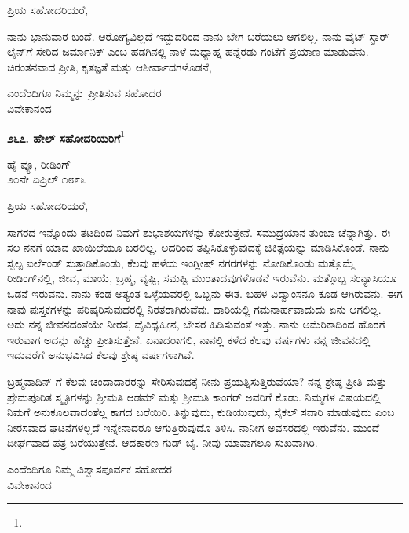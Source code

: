\noindent
ಪ್ರಿಯ ಸಹೋದರಿಯರೆ,

ನಾನು ಭಾನುವಾರ ಬಂದೆ. ಆರೋಗ್ಯವಿಲ್ಲದೆ ಇದ್ದುದರಿಂದ ನಾನು ಬೇಗ ಬರೆಯಲು ಆಗಲಿಲ್ಲ. ನಾನು ವೈಟ್‌ ಸ್ಟಾರ್‌ ಲೈನ್‌ಗೆ ಸೇರಿದ ಜರ್ಮಾನಿಕ್ ಎಂಬ ಹಡಗಿನಲ್ಲಿ ನಾಳೆ ಮಧ್ಯಾಹ್ನ ಹನ್ನೆರಡು ಗಂಟೆಗೆ ಪ್ರಯಾಣ ಮಾಡುವೆನು. ಚಿರಂತನವಾದ ಪ್ರೀತಿ, ಕೃತಜ್ಞತೆ ಮತ್ತು ಆಶೀರ್ವಾದಗಳೊಡನೆ,

\vspace{-0.5cm}

{\flushright
ಎಂದೆಂದಿಗೂ ನಿಮ್ಮನ್ನು ಪ್ರೀತಿಸುವ ಸಹೋದರ\\ವಿವೇಕಾನಂದ\par}


\begin{center}
\textbf{೨೬೭. ಹೇಲ್ ಸಹೋದರಿಯರಿಗೆ}\footnote{}
\end{center}

\vspace{-0.5cm}

\begin{flushright}
ಹೈ ವ್ಯೂ, ರೀಡಿಂಗ್\\೨೦ನೇ ಏಪ್ರಿಲ್ ೧೮೯೬
\end{flushright}

\vspace{-0.3cm}

\noindent
ಪ್ರಿಯ ಸಹೋದರಿಯರೆ,

ಸಾಗರದ ಇನ್ನೊಂದು ತಟದಿಂದ ನಿಮಗೆ ಶುಭಾಶಯಗಳನ್ನು ಕೋರುತ್ತೇನೆ. ಸಮುದ್ರಯಾನ ತುಂಬಾ ಚೆನ್ನಾಗಿತ್ತು. ಈ ಸಲ ನನಗೆ ಯಾವ ಖಾಯಿಲೆಯೂ ಬರಲಿಲ್ಲ. ಅದರಿಂದ ತಪ್ಪಿಸಿಕೊಳ್ಳುವುದಕ್ಕೆ ಚಿಕಿತ್ಸೆಯನ್ನು ಮಾಡಿಸಿಕೊಂಡೆ. ನಾನು ಸ್ವಲ್ಪ ಐರ್ಲೆಂಡ್ ಸುತ್ತಾಡಿಕೊಂಡು, ಕೆಲವು ಹಳೆಯ ಇಂಗ್ಲೀಷ್ ನಗರಗಳನ್ನು ನೋಡಿಕೊಂಡು ಮತ್ತೊಮ್ಮೆ ರೀಡಿಂಗ್‌ನಲ್ಲಿ, ಜೀವ, ಮಾಯೆ, ಬ್ರಹ್ಮ, ವ್ಯಷ್ಟಿ, ಸಮಷ್ಟಿ ಮುಂತಾದವುಗಳೊಡನೆ ಇರುವೆನು. ಮತ್ತೊಬ್ಬ ಸಂನ್ಯಾಸಿಯೂ ಒಡನೆ ಇರುವನು. ನಾನು ಕಂಡ ಅತ್ಯಂತ ಒಳ್ಳೆಯವರಲ್ಲಿ ಒಬ್ಬನು ಈತ. ಬಹಳ ವಿದ್ವಾಂಸನೂ ಕೂಡ ಆಗಿರುವನು. ಈಗ ನಾವು ಪುಸ್ತಕಗಳನ್ನು ಪರಿಷ್ಕರಿಸುವುದರಲ್ಲಿ ನಿರತರಾಗಿರುವೆವು. ದಾರಿಯಲ್ಲಿ ಗಮನಾರ್ಹವಾದುದು ಏನು ಆಗಲಿಲ್ಲ. ಅದು ನನ್ನ ಜೀವನದಂತೆಯೇ ನೀರಸ, ವೈವಿಧ್ಯಹೀನ, ಬೇಸರ ಹಿಡಿಸುವಂತೆ ಇತ್ತು. ನಾನು ಅಮೆರಿಕಾದಿಂದ ಹೊರಗೆ ಇರುವಾಗ ಅದನ್ನು ಹೆಚ್ಚು ಪ್ರೀತಿಸುತ್ತೇನೆ. ಏನಾದರಾಗಲಿ, ನಾನಲ್ಲಿ ಕಳೆದ ಕೆಲವು ವರ್ಷಗಳು ನನ್ನ ಜೀವನದಲ್ಲಿ ಇದುವರೆಗೆ ಅನುಭವಿಸಿದ ಕೆಲವು ಶ್ರೇಷ್ಠ ವರ್ಷಗಳಾಗಿವೆ.

ಬ್ರಹ್ಮವಾದಿನ್ ಗೆ ಕೆಲವು ಚಂದಾದಾರರನ್ನು ಸೇರಿಸುವುದಕ್ಕೆ ನೀನು ಪ್ರಯತ್ನಿಸುತ್ತಿರುವೆಯಾ? ನನ್ನ ಶ್ರೇಷ್ಠ ಪ್ರೀತಿ ಮತ್ತು ಪ್ರೇಮಪೂರಿತ ಸ್ಮೃತಿಗಳನ್ನು ಶ‍್ರೀಮತಿ ಆಡಮ್ ಮತ್ತು ಶ‍್ರೀಮತಿ ಕಾಂಗರ್‌ ಅವರಿಗೆ ಕೊಡು. ನಿಮ್ಮಗಳ ವಿಷಯದಲ್ಲಿ ನಿಮಗೆ ಅನುಕೂಲವಾದಂತೆಲ್ಲ ಕಾಗದ ಬರೆಯಿರಿ. ತಿನ್ನುವುದು, ಕುಡಿಯುವುದು, ಸೈಕಲ್ ಸವಾರಿ ಮಾಡುವುದು ಎಂಬ ನೀರಸವಾದ ಘಟನೆಗಳಲ್ಲದೆ ಇನ್ನೇನಾದರೂ ಆಗುತ್ತಿರುವುದೊ ತಿಳಿಸಿ. ನಾನೀಗ ಅವಸರದಲ್ಲಿ ಇರುವೆನು. ಮುಂದೆ ದೀರ್ಘವಾದ ಪತ್ರ ಬರೆಯುತ್ತೇನೆ. ಆದಕಾರಣ ಗುಡ್ ಬೈ. ನೀವು ಯಾವಾಗಲೂ ಸುಖವಾಗಿರಿ.

\begin{flushright}
ಎಂದೆಂದಿಗೂ ನಿಮ್ಮ ವಿಶ್ವಾಸಪೂರ್ವಕ ಸಹೋದರ\\ವಿವೇಕಾನಂದ
\end{flushright}


